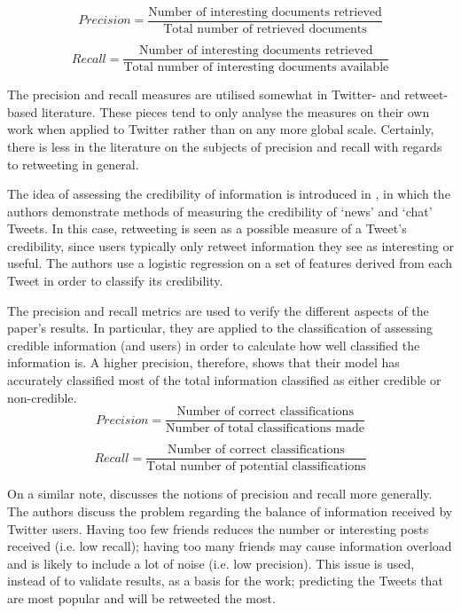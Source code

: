 \[	
	Precision = \frac{\text{Number of interesting documents retrieved}}{\text{Total number of retrieved documents}}
\]

\[
	Recall = \frac{\text{Number of interesting documents retrieved}}{\text{Total number of interesting documents available}}
\]

The precision and recall measures are utilised somewhat in Twitter- and retweet-based literature. These pieces tend to only analyse the measures on their own work when applied to Twitter rather than on any more global scale. Certainly, there is less in the literature on the subjects of precision and recall with regards to retweeting in general.

The idea of assessing the credibility of information is introduced in \cite{castillo11}, in which the authors demonstrate methods of measuring the credibility of `news' and `chat' Tweets. In this case, retweeting is seen as a possible measure of a Tweet's credibility, since users typically only retweet information they see as interesting or useful. The authors use a logistic regression on a set of features derived from each Tweet in order to classify its credibility. 

The precision and recall metrics are used to verify the different aspects of the paper's results. In particular, they are applied to the classification of assessing credible information (and users) in order to calculate how well classified the information is. A higher precision, therefore, shows that their model has accurately classified most of the total information classified as either credible or non-credible.
\[	
	Precision = \frac{\text{Number of correct classifications}}{\text{Number of total classifications made}}
\]

\[
	Recall = \frac{\text{Number of correct classifications}}{\text{Total number of potential classifications}}
\]

On a similar note, \cite{hong11} discusses the notions of precision and recall more generally. The authors discuss the problem regarding the balance of information received by Twitter users. Having too few friends reduces the number or interesting posts received (i.e. low recall); having too many friends may cause information overload and is likely to include a lot of noise (i.e. low precision). This issue is used, instead of to validate results,  as a basis for the work; predicting the Tweets that are most popular and will be retweeted the most.

